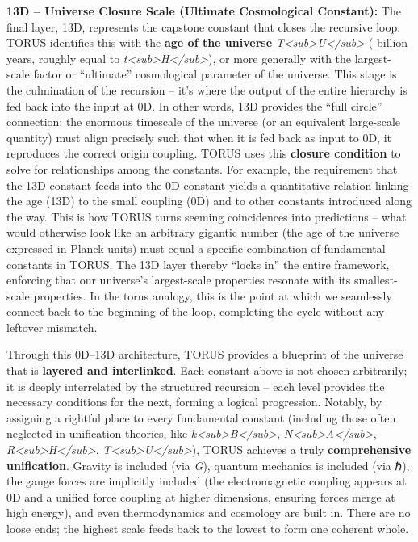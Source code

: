 \documentclass[
]{article}
\begin{document}
\textbf{13D -- Universe Closure Scale (Ultimate Cosmological Constant):}
The final layer, 13D, represents the capstone constant that closes the
recursive loop. TORUS identifies this with the \textbf{age of the
universe} \emph{T\textless sub\textgreater U\textless/sub\textgreater{}}
( billion years, roughly equal to
\emph{t\textless sub\textgreater H\textless/sub\textgreater{}}), or more
generally with the largest-scale factor or ``ultimate'' cosmological
parameter of the universe. This stage is the culmination of the
recursion -- it's where the output of the entire hierarchy is fed back
into the input at 0D. In other words, 13D provides the ``full circle''
connection: the enormous timescale of the universe (or an equivalent
large-scale quantity) must align precisely such that when it is fed back
as input to 0D, it reproduces the correct origin coupling. TORUS uses
this \textbf{closure condition} to solve for relationships among the
constants. For example, the requirement that the 13D constant feeds into
the 0D constant yields a quantitative relation linking the age (13D) to
the small coupling (0D) and to other constants introduced along the way.
This is how TORUS turns seeming coincidences into predictions -- what
would otherwise look like an arbitrary gigantic number (the age of the
universe expressed in Planck units) must equal a specific combination of
fundamental constants in TORUS. The 13D layer thereby ``locks in'' the
entire framework, enforcing that our universe's largest-scale properties
resonate with its smallest-scale properties. In the torus analogy, this
is the point at which we seamlessly connect back to the beginning of the
loop, completing the cycle without any leftover mismatch.

Through this 0D--13D architecture, TORUS provides a blueprint of the
universe that is \textbf{layered and interlinked}. Each constant above
is not chosen arbitrarily; it is deeply interrelated by the structured
recursion -- each level provides the necessary conditions for the next,
forming a logical progression. Notably, by assigning a rightful place to
every fundamental constant (including those often neglected in
unification theories, like
\emph{k\textless sub\textgreater B\textless/sub\textgreater{}},
\emph{N\textless sub\textgreater A\textless/sub\textgreater{}},
\emph{R\textless sub\textgreater H\textless/sub\textgreater{}},
\emph{T\textless sub\textgreater U\textless/sub\textgreater{}}), TORUS
achieves a truly \textbf{comprehensive unification}. Gravity is included
(via \emph{G}), quantum mechanics is included (via ℏ), the gauge forces
are implicitly included (the electromagnetic coupling appears at 0D and
a unified force coupling at higher dimensions, ensuring forces merge at
high energy), and even thermodynamics and cosmology are built in. There
are no loose ends; the highest scale feeds back to the lowest to form
one coherent whole.
\end{document}
